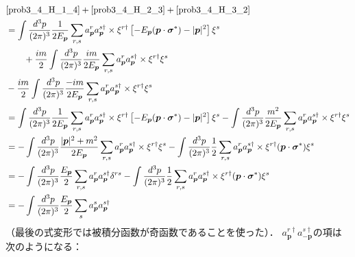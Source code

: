 \begin{align}
  & \eqref{prob3_4_H_1_4} + \eqref{prob3_4_H_2_3} + \eqref{prob3_4_H_3_2} \notag \\
  & = \int \frac{d^3p}{(2\pi)^3} \frac{1}{2E_{\boldsymbol{p}}} \sum_{r, s} a_{\boldsymbol{p}}^{r} a_{\boldsymbol{p}}^{s\dagger}
  \times \xi^{r\dagger} \left [ - E_{\boldsymbol{p}} (\boldsymbol{p} \cdot \boldsymbol{\sigma}^\ast) - \lvert \boldsymbol{p} \rvert^2 \right ] \xi^s \notag \\
  & \qquad + \frac{im}{2} \int \frac{d^3p}{(2\pi)^3} \frac{im}{2E_{\boldsymbol{p}}} \sum_{r, s} a_{\boldsymbol{p}}^{r} a_{\boldsymbol{p}}^{s\dagger} \times \xi^{r\dagger} \xi^s \notag \\
  & - \frac{im}{2}\int \frac{d^3p}{(2\pi)^3} \frac{-im}{2E_{\boldsymbol{p}}} \sum_{r, s} a_{\boldsymbol{p}}^{r} a_{\boldsymbol{p}}^{s\dagger} \times \xi^{r\dagger} \xi^s \notag \\
  & = \int \frac{d^3p}{(2\pi)^3} \frac{1}{2E_{\boldsymbol{p}}} \sum_{r, s} a_{\boldsymbol{p}}^{r} a_{\boldsymbol{p}}^{s\dagger}
  \times \xi^{r\dagger} \left [ - E_{\boldsymbol{p}} (\boldsymbol{p} \cdot \boldsymbol{\sigma}^\ast) - \lvert \boldsymbol{p} \rvert^2 \right ] \xi^s - \int \frac{d^3p}{(2\pi)^3} \frac{m^2}{2E_{\boldsymbol{p}}}
  \sum_{r, s} a_{\boldsymbol{p}}^{r} a_{\boldsymbol{p}}^{s\dagger} \times \xi^{r\dagger} \xi^s \notag \\
  & = - \int \frac{d^3p}{(2\pi)^3} \frac{\lvert \boldsymbol{p} \rvert^2 + m^2}{2E_{\boldsymbol{p}}}
  \sum_{r, s} a_{\boldsymbol{p}}^{r} a_{\boldsymbol{p}}^{s\dagger} \times \xi^{r\dagger} \xi^s - \int \frac{d^3p}{(2\pi)^3} \frac{1}{2}
  \sum_{r, s} a_{\boldsymbol{p}}^{r} a_{\boldsymbol{p}}^{s\dagger} \times \xi^{r\dagger} (\boldsymbol{p} \cdot \boldsymbol{\sigma}^\ast) \xi^s \notag \\
  & = - \int \frac{d^3p}{(2\pi)^3} \frac{E_{\boldsymbol{p}}}{2}
  \sum_{r, s} a_{\boldsymbol{p}}^{r} a_{\boldsymbol{p}}^{s\dagger} \delta^{rs} - \int \frac{d^3p}{(2\pi)^3} \frac{1}{2}
  \sum_{r, s} a_{\boldsymbol{p}}^{r} a_{\boldsymbol{p}}^{s\dagger} \times \xi^{r\dagger} (\boldsymbol{p} \cdot \boldsymbol{\sigma}^\ast) \xi^s \notag \\
  & = - \int \frac{d^3p}{(2\pi)^3} \frac{E_{\boldsymbol{p}}}{2} \sum_{s} a_{\boldsymbol{p}}^{s} a_{\boldsymbol{p}}^{s\dagger} \label{prob3_4_ac}
\end{align}
（最後の式変形では被積分函数が奇函数であることを使った）．
$a_{\boldsymbol{p}}^{r\dagger} a_{-\boldsymbol{p}}^{s\dagger}$の項は次のようになる：
